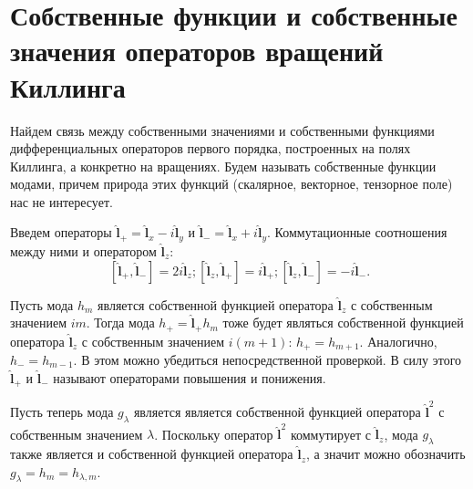 \documentclass[12pt,a4paper]{article}
\newcommand{\V}[1]{\mathbf{#1}}
\newcommand{\Op}[1]{\hat{\V{#1}}}
\begin{document}

    \section{Собственные функции и собственные значения операторов вращений Киллинга}

        Найдем связь между собственными значениями и собственными функциями дифференциальных операторов первого порядка, построенных на полях Киллинга, а конкретно на вращениях. Будем называть собственные функции модами, причем природа этих функций (скалярное, векторное, тензорное поле) нас не интересует.

        Введем операторы $\Op{l}_{+} = \Op{l}_x - i\Op{l}_y$ и $\Op{l}_{-} = \Op{l}_x + i\Op{l}_y$. Коммутационные соотношения между ними и оператором $\Op{l}_z$:
        \begin{equation}
            \left[ \Op{l}_{+}, \Op{l}_{-} \right] = 2 i \Op{l}_{z} ;
            \left[ \Op{l}_{z}, \Op{l}_{+} \right] =   i \Op{l}_{+} ;
            \left[ \Op{l}_{z}, \Op{l}_{-} \right] = - i \Op{l}_{-} .
        \end{equation}

        Пусть мода $h_m$ является собственной функцией оператора $\Op{l}_z$ с собственным значением $i m$. Тогда мода $h_{+} = \Op{l}_{+} h_m$ тоже будет являться собственной функцией оператора $\Op{l}_z$ с собственным значением $i (m + 1)$: $h_{+} = h_{m + 1}$. Аналогично, $h_{-} = h_{m - 1}$. В этом можно убедиться непосредственной проверкой. В силу этого $\Op{l}_{+}$ и $\Op{l}_{-}$ называют операторами повышения и понижения.

        Пусть теперь мода $g_\lambda$ является является собственной функцией оператора $\Op{l}^2$ с собственным значением $\lambda$. Поскольку оператор $\Op{l}^2$ коммутирует с $\Op{l}_z$, мода $g_\lambda$ также является и собственной функцией оператора $\Op{l}_z$, а значит можно обозначить $g_\lambda = h_m = h_{\lambda,m}$.
\end{document}
